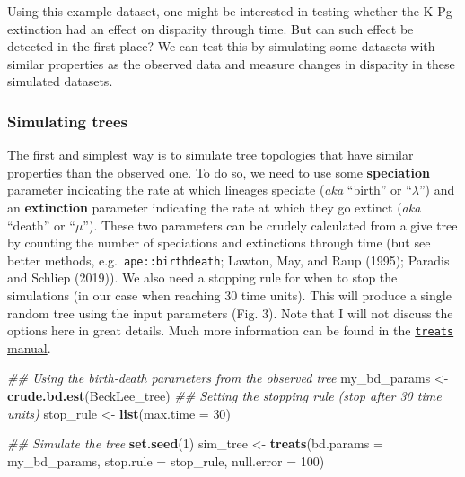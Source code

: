 \documentclass[
]{article}
\newenvironment{Shaded}{\begin{snugshade}}{\end{snugshade}}
\newcommand{\CommentTok}[1]{\textcolor[rgb]{0.56,0.35,0.01}{\textit{#1}}}
\newcommand{\DataTypeTok}[1]{\textcolor[rgb]{0.13,0.29,0.53}{#1}}
\newcommand{\DecValTok}[1]{\textcolor[rgb]{0.00,0.00,0.81}{#1}}
\newcommand{\KeywordTok}[1]{\textcolor[rgb]{0.13,0.29,0.53}{\textbf{#1}}}
\newcommand{\NormalTok}[1]{#1}
\newcommand{\StringTok}[1]{\textcolor[rgb]{0.31,0.60,0.02}{#1}}
\begin{document}
Using this example dataset, one might be interested in testing whether
the K-Pg extinction had an effect on disparity through time. But can
such effect be detected in the first place? We can test this by
simulating some datasets with similar properties as the observed data
and measure changes in disparity in these simulated datasets.

\hypertarget{simulating-trees}{%
\subsubsection{Simulating trees}\label{simulating-trees}}

The first and simplest way is to simulate tree topologies that have
similar properties than the observed one. To do so, we need to use some
\textbf{speciation} parameter indicating the rate at which lineages
speciate (\emph{aka} ``birth'' or ``\(\lambda\)'') and an
\textbf{extinction} parameter indicating the rate at which they go
extinct (\emph{aka} ``death'' or ``\(\mu\)''). These two parameters can
be crudely calculated from a give tree by counting the number of
speciations and extinctions through time (but see better methods,
e.g.~\texttt{ape::birthdeath}; Lawton, May, and Raup (1995); Paradis and
Schliep (2019)). We also need a stopping rule for when to stop the
simulations (in our case when reaching 30 time units). This will produce
a single random tree using the input parameters (Fig. 3). Note that I
will not discuss the options here in great details. Much more
information can be found in the
\href{http://tguillerme.github.io/treats.html}{\texttt{treats} manual}.

\begin{Shaded}
\begin{Highlighting}[]
\CommentTok{\#\# Using the birth{-}death parameters from the observed tree}
\NormalTok{my\_bd\_params \textless{}{-}}\StringTok{ }\KeywordTok{crude.bd.est}\NormalTok{(BeckLee\_tree)}
\CommentTok{\#\# Setting the stopping rule (stop after 30 time units)}
\NormalTok{stop\_rule \textless{}{-}}\StringTok{ }\KeywordTok{list}\NormalTok{(}\DataTypeTok{max.time =} \DecValTok{30}\NormalTok{)}

\CommentTok{\#\# Simulate the tree}
\KeywordTok{set.seed}\NormalTok{(}\DecValTok{1}\NormalTok{)}
\NormalTok{sim\_tree \textless{}{-}}\StringTok{ }\KeywordTok{treats}\NormalTok{(}\DataTypeTok{bd.params  =}\NormalTok{ my\_bd\_params,}
                   \DataTypeTok{stop.rule  =}\NormalTok{ stop\_rule,}
                   \DataTypeTok{null.error =} \DecValTok{100}\NormalTok{)}
\end{Highlighting}
\end{Shaded}
\end{document}
